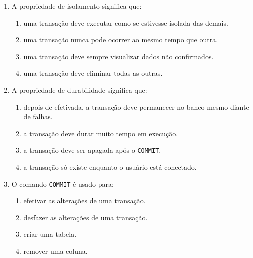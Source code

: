 \documentclass[12pt,a4paper]{article}
\begin{document}
\begin{enumerate}[label=\textbf{Q\arabic*.}]
\begin{enumerate}[label=\alph*)]
    \item a transação deve levar o banco de um estado consistente para outro estado consistente.
    \item a transação deve ignorar todas as restrições.
    \item a transação deve gerar valores duplicados obrigatoriamente.
    \item a transação não pode alterar dados.
\end{enumerate}

\item A propriedade de isolamento significa que:

\begin{enumerate}[label=\alph*)]
    \item uma transação deve executar como se estivesse isolada das demais.
    \item uma transação nunca pode ocorrer ao mesmo tempo que outra.
    \item uma transação deve sempre visualizar dados não confirmados.
    \item uma transação deve eliminar todas as outras.
\end{enumerate}

\item A propriedade de durabilidade significa que:

\begin{enumerate}[label=\alph*)]
    \item depois de efetivada, a transação deve permanecer no banco mesmo diante de falhas.
    \item a transação deve durar muito tempo em execução.
    \item a transação deve ser apagada após o \texttt{COMMIT}.
    \item a transação só existe enquanto o usuário está conectado.
\end{enumerate}

\item O comando \texttt{COMMIT} é usado para:

\begin{enumerate}[label=\alph*)]
    \item efetivar as alterações de uma transação.
    \item desfazer as alterações de uma transação.
    \item criar uma tabela.
    \item remover uma coluna.
\end{enumerate}


\end{enumerate}
\end{document}
